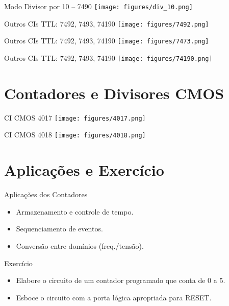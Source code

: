 \documentclass{beamer}
\begin{document}
\begin{frame}{Modo Divisor por 10 – 7490}
\centering
\texttt{[image: figures/div\_10.png]}
\end{frame}

\begin{frame}{Outros CIs TTL: 7492, 7493, 74190}
\centering
\texttt{[image: figures/7492.png]}

\end{frame}

\begin{frame}{Outros CIs TTL: 7492, 7493, 74190}
\centering
\texttt{[image: figures/7473.png]}

\end{frame}

\begin{frame}{Outros CIs TTL: 7492, 7493, 74190}
\centering
\texttt{[image: figures/74190.png]}

\end{frame}

\section{Contadores e Divisores CMOS}

\begin{frame}{CI CMOS 4017}
\centering
\texttt{[image: figures/4017.png]}
\end{frame}

\begin{frame}{CI CMOS 4018}
\centering
\texttt{[image: figures/4018.png]}
\end{frame}

\section{Aplicações e Exercício}

\begin{frame}{Aplicações dos Contadores}
\begin{itemize}
  \item Armazenamento e controle de tempo.
  \item Sequenciamento de eventos.
  \item Conversão entre domínios (freq./tensão).
\end{itemize}
\end{frame}

\begin{frame}{Exercício}
\begin{itemize}
  \item Elabore o circuito de um contador programado que conta de 0 a 5.
  \item Esboce o circuito com a porta lógica apropriada para RESET.
\end{itemize}
\end{frame}
\end{document}
